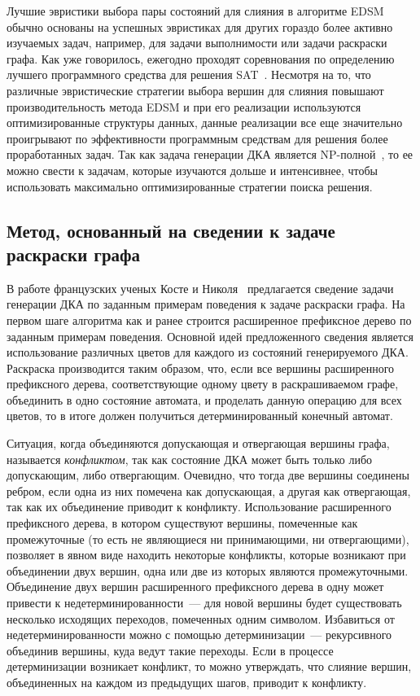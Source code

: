 Лучшие эвристики выбора пары состояний для слияния в алгоритме EDSM обычно основаны на успешных эвристиках для других гораздо более активно изучаемых задач, например, для задачи выполнимости или задачи раскраски графа.
Как уже говорилось, ежегодно проходят соревнования по определению лучшего программного средства для решения SAT~\cite{sat-competitions}.
Несмотря на то, что различные эвристические стратегии выбора вершин для слияния повышают производительность метода EDSM и при его реализации используются оптимизированные структуры данных, данные реализации все еще значительно проигрывают по эффективности программным средствам для решения более проработанных задач.
Так как задача генерации ДКА является NP-полной~\cite{DBLP:journals/iandc/Gold78}, то ее можно свести к задачам, которые изучаются дольше и интенсивнее, чтобы использовать максимально оптимизированные стратегии поиска решения.

\subsection{Метод, основанный на сведении к задаче раскраски графа}
\label{sec:review:sat-dfa-inf:coloring}

В работе французских ученых Косте и Николя~\cite{Coste97regularinference} предлагается сведение задачи генерации ДКА по заданным примерам поведения к задаче раскраски графа.
На первом шаге алгоритма как и ранее строится расширенное префиксное дерево по заданным примерам поведения.
Основной идей предложенного сведения является использование различных цветов для каждого из состояний генерируемого ДКА.
Раскраска производится таким образом, что, если все вершины расширенного префиксного дерева, соответствующие одному цвету в раскрашиваемом графе, объединить в одно состояние автомата, и проделать данную операцию для всех цветов, то в итоге должен получиться детерминированный конечный автомат. 

Ситуация, когда объединяются допускающая и отвергающая вершины графа, называется \emph{конфликтом}, так как состояние ДКА может быть только либо допускающим, либо отвергающим.
Очевидно, что тогда две вершины соединены ребром, если одна из них помечена как допускающая, а другая как отвергающая, так как их объединение приводит к конфликту.
Использование расширенного префиксного дерева, в котором существуют вершины, помеченные как промежуточные (то есть не являющиеся ни принимающими, ни отвергающими), позволяет в явном виде находить некоторые конфликты, которые возникают при объединении двух вершин, одна или две из которых являются промежуточными.
Объединение двух вершин расширенного префиксного дерева в одну может привести к недетерминированности~--- для новой вершины будет существовать несколько исходящих переходов, помеченных одним символом.
Избавиться от недетерминированности можно с помощью детерминизации~--- рекурсивного объединив вершины, куда ведут такие переходы.
Если в процессе детерминизации возникает конфликт, то можно утверждать, что слияние вершин, объединенных на каждом из предыдущих шагов, приводит к конфликту.

